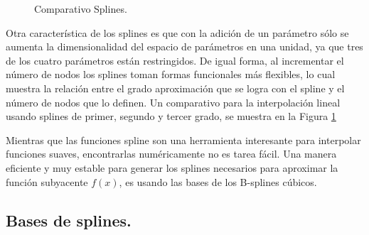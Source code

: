 \begin{figure}[h]
\caption{Comparativo Splines.}
\label{spline_4}
\end{figure}


\hspace{0.4cm} Otra caracter\'istica de los splines es que con la adici\'on de un par\'ametro s\'olo se aumenta la dimensionalidad del espacio de par\'ametros en una unidad, ya que tres de los cuatro par\'ametros est\'an restringidos. De igual forma, al incrementar el n\'umero de nodos los splines toman formas funcionales m\'as flexibles, lo cual muestra la relaci\'on entre el grado aproximaci\'on que se logra con el spline y el n\'umero de nodos que lo definen. Un comparativo para la interpolaci\'on lineal usando splines de primer, segundo y tercer grado, se muestra en la Figura \ref{spline_4}


\hspace{0.4cm} Mientras que las funciones spline son una herramienta interesante para interpolar funciones suaves, encontrarlas num\'ericamente no es tarea f\'acil. Una manera eficiente y muy estable para generar los splines necesarios para aproximar la funci\'on subyacente $f(x)$, es usando las bases de los B-splines c\'ubicos.


\subsection{Bases de splines.\\}

